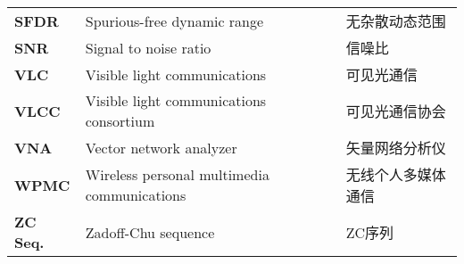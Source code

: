 \begin{terminology}
\begin{longtable}{lll}
        \bf{SFDR}        &	Spurious-free dynamic range               &	无杂散动态范围	\\
        \bf{SNR}         &	Signal to noise ratio                     &	信噪比	\\
        \bf{VLC}         &	Visible light communications              &	可见光通信	\\
        \bf{VLCC}        &	Visible light communications consortium   &	可见光通信协会	\\
        \bf{VNA}         &	Vector network analyzer                   &	矢量网络分析仪	\\
        \bf{WPMC}        &	Wireless personal multimedia communications   &	无线个人多媒体通信	\\
        \bf{ZC Seq.}     &	Zadoff-Chu sequence                           &	ZC序列	\\
    \end{longtable}
\end{terminology} 